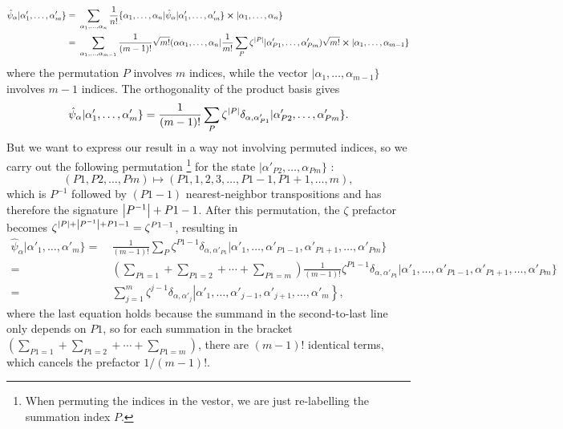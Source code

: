 \documentclass{article}
\theoremstyle{definition}
\theoremstyle{plain}
\numberwithin{equation}{section}
\begin{document}
\begin{align*}
    \hat{\psi}_{\alpha}
    |\alpha'_{1}, \ldots ,\alpha'_{m}\}
    =&\ 
    \sum_{\alpha_1, \ldots ,\alpha_{n}}
    \frac{1}{n!}
    \{\alpha_1, \ldots ,\alpha_{n}|
    \hat{\psi}_{\alpha}|
    \alpha'_{1}, \ldots ,\alpha'_{m}\}
    \cross 
    |\alpha_1, \ldots ,\alpha_{n}\} \\
    =&\ 
    \sum_{\alpha_1, \ldots ,\alpha_{m-1}}
    \frac{1}{(m-1)!}
    \sqrt{m!}
    (\alpha \alpha_1, \ldots ,\alpha_n
    |\frac{1}{m!}\sum_{P}\zeta^{\abs{P}}|
    \alpha'_{P1}, \ldots ,\alpha'_{Pm})
    \sqrt{m!}
    \cross 
    |\alpha_1, \ldots ,\alpha_{m-1}\}
\end{align*}
where the permutation $P$ involves $m$ indices, 
while the vector 
$|\alpha_1, \ldots ,\alpha_{m-1}\}$ 
involves $m-1$ indices. The orthogonality of 
the product basis gives 
\begin{align*}
    \hat{\psi}_{\alpha}
    |\alpha'_{1}, \ldots ,\alpha'_{m}\}
    =
    \frac{1}{(m-1)!}
    \sum_{P}\zeta^{\abs{P}}
    \delta_{\alpha,\alpha'_{P1}}
    |\alpha'_{P2}, \ldots ,\alpha'_{Pm}\}.
\end{align*}
But we want to express our result in a way 
not involving permuted indices, 
so we carry out the following permutation
\footnote{
    When permuting the indices in the vestor, 
    we are just 
    re-labelling the summation index $P$.
}
for the state 
$|\alpha'_{P2}, \ldots ,\alpha_{Pm}\}$ 
:
\[
    (P1, P2,\ldots ,Pm)
    \mapsto
    (P1,1,2,3, \ldots ,
    P1-1,P1+1, \ldots ,m),
\]
which is $P^{-1}$ followed by 
$(P1-1)$ nearest-neighbor transpositions and has 
therefore the signature $\abs{P ^{-1}}+P1-1$. 
After this permutation, the $\zeta$ prefactor becomes 
$\zeta^{\abs{P}+\abs{P ^{-1}} + P1 -1} = \zeta^{P1-1}$, 
resulting in
\begin{align*}
    \hat{\psi}_{\alpha}
    |\alpha'_{1}, \ldots ,\alpha'_{m}\}
    =&\ 
    \frac{1}{(m-1)!}
    \sum_{P}
    \zeta^{P1-1}
    \delta_{\alpha,\alpha'_{P1}}
    |\alpha'_{1}, \ldots ,
    \alpha'_{P1-1},\alpha'_{P1+1}, \ldots ,
    \alpha'_{Pm}\} \\
    =&\ 
    \left(\sum_{P1=1}+
    \sum_{P1=2}+ \cdots +
    \sum_{P1=m}\right) 
    \frac{1}{(m-1)!}
    \zeta^{P1-1}
    \delta_{\alpha,\alpha'_{P1}}
    |\alpha'_{1}, \ldots ,
    \alpha'_{P1-1},\alpha'_{P1+1}, \ldots ,
    \alpha'_{Pm}\} \\
    =&\ 
    \sum_{j=1}^{m}
    \zeta^{j-1}
    \delta_{\alpha,\alpha'_{j}}
    \left|\alpha'_{1}, \ldots ,\alpha'_{j-1},
    \alpha'_{j+1}, \ldots ,\alpha'_{m}\right\},
\end{align*}
where the last equation holds because 
the summand 
in the second-to-last line only depends on $P1$, 
so for each summation in the bracket 
$
    \left(\sum_{P1=1}+
    \sum_{P1=2}+ \cdots +
    \sum_{P1=m}\right) 
$,
there are $(m-1)!$ identical terms, which 
cancels the prefactor $1 /(m-1)!$.
\end{document}
